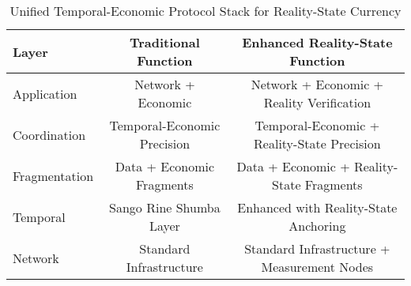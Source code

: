 \documentclass[12pt,a4paper]{article}
\begin{document}
\begin{table}[H]
\centering
\caption{Unified Temporal-Economic Protocol Stack for Reality-State Currency}
\begin{tabular}{@{}lcc@{}}
\toprule
\textbf{Layer} & \textbf{Traditional Function} & \textbf{Enhanced Reality-State Function} \\
\midrule
Application & Network + Economic & Network + Economic + Reality Verification \\
Coordination & Temporal-Economic Precision & Temporal-Economic + Reality-State Precision \\
Fragmentation & Data + Economic Fragments & Data + Economic + Reality-State Fragments \\
Temporal & Sango Rine Shumba Layer & Enhanced with Reality-State Anchoring \\
Network & Standard Infrastructure & Standard Infrastructure + Measurement Nodes \\
\bottomrule
\end{tabular}
\end{table}
\end{document}
